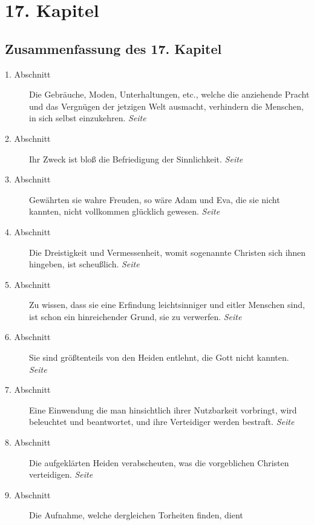 
\chapter{17. Kapitel} \label{kap17}
\section{Zusammenfassung des 17. Kapitel}

\begin{description}
\item[1. Abschnitt] Die Gebräuche, Moden, Unterhaltungen, etc., welche die
anziehende Pracht und das Vergnügen der jetzigen Welt ausmacht, verhindern die
Menschen, in sich selbst einzukehren.
\dotfill \textit{Seite~\pageref{kap17_ab1}}\\
\item[2. Abschnitt] Ihr Zweck ist bloß die Befriedigung der Sinnlichkeit.
\dotfill \textit{Seite~\pageref{kap17_ab2}}\\
\item[3. Abschnitt] Gewährten sie wahre Freuden, so wäre Adam und Eva, die sie
nicht kannten, nicht vollkommen glücklich gewesen.
\dotfill \textit{Seite~\pageref{kap17_ab3}}\\
\item[4. Abschnitt] Die Dreistigkeit und Vermessenheit, womit sogenannte
Christen sich ihnen hingeben, ist scheußlich.
\dotfill \textit{Seite~\pageref{kap17_ab4}}\\
\item[5. Abschnitt] Zu wissen, dass sie eine Erfindung leichtsinniger und eitler
Menschen sind, ist schon ein hinreichender Grund, sie zu verwerfen.
\dotfill \textit{Seite~\pageref{kap17_ab5}}\\
\item[6. Abschnitt] Sie sind größtenteils von den Heiden entlehnt, die Gott
nicht kannten.
\dotfill \textit{Seite~\pageref{kap17_ab6}}\\
\item[7. Abschnitt] Eine Einwendung die man hinsichtlich ihrer Nutzbarkeit
vorbringt, wird beleuchtet und beantwortet, und ihre Verteidiger werden
bestraft.
\dotfill \textit{Seite~\pageref{kap17_ab7}}\\
\item[8. Abschnitt] Die aufgeklärten Heiden verabscheuten, was die vorgeblichen
Christen verteidigen.
\dotfill \textit{Seite~\pageref{kap17_ab8}}\\
\item[9. Abschnitt] Die Aufnahme, welche dergleichen Torheiten finden, dient

\end{description}
